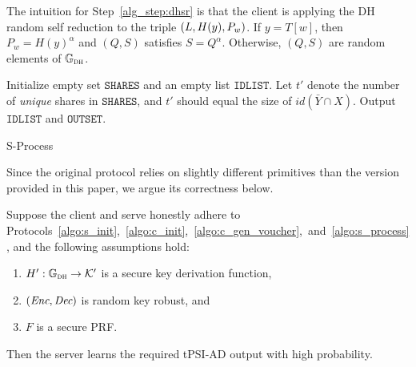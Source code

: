 The intuition for Step~\ref{alg_step:dhsr} is that the client is applying the DH random self reduction to the triple $\left(L, H(y), P_w\right)$. If $y = T[w]$, then $P_w = H(y)^\alpha$ and $(Q,S)$ satisfies $S = Q^\alpha$. Otherwise, $(Q,S)$ are random elements of $\mathbb{G}_{\textsc{dh}}$.


\begin{algorithm}[H]
\DontPrintSemicolon
Initialize empty set $\texttt{{SHARES}}$ and an empty list $\texttt{IDLIST}$.\;
Let $t'$ denote the number of \emph{unique} shares in $\texttt{SHARES}$, and $t'$ should equal the size of $id (\bar{Y} \cap X)$. \; 
Output $\texttt{IDLIST}$ and $\texttt{OUTSET}$.\; 
\caption{{\sf S-Process}} 
\label{algo:s_process}
\end{algorithm}

Since the original protocol relies on slightly different primitives than the version provided in this paper, we argue its correctness below.
\begin{theorem}[Correctness]
Suppose the client and serve honestly adhere to Protocols~\ref{algo:s_init},~\ref{algo:c_init},~\ref{algo:c_gen_voucher},~and~\ref{algo:s_process}, and the following assumptions hold:
\begin{enumerate}[label=(\roman*)]
    \item  $H' : \mathbb{G}_{\textsc{dh}} \to \mathcal{K}'$ is a secure key derivation function,
    \item $(\emph{\text{Enc}}, \emph{\text{Dec}})$ is random key robust, and
    \item $F$ is a secure PRF.
\end{enumerate}
Then the server learns the required tPSI-AD output with high probability.
\end{theorem}

